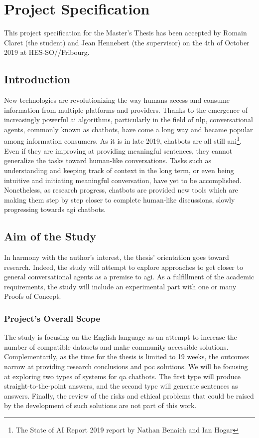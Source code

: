 \chapter*{Project Specification}
This project specification for the Master's Thesis has been accepted by Romain Claret (the student) and Jean Hennebert (the supervisor) on the 4th of October 2019 at HES-SO//Fribourg.

\section*{Introduction}
New technologies are revolutionizing the way humans access and consume information from multiple platforms and providers. Thanks to the emergence of increasingly powerful \gls{ai} algorithms, particularly in the field of \gls{nlp}, conversational agents, commonly known as chatbots, have come a long way and became popular among information consumers. As it is in late 2019, chatbots are all still \gls{ani}\footnote{The State of AI Report 2019 report by Nathan Benaich and Ian Hogar\cite{studies:state_of_ai_2019}}. Even if they are improving at providing meaningful sentences, they cannot generalize the tasks toward human-like conversations. Tasks such as understanding and keeping track of context in the long term, or even being intuitive and initiating meaningful conversation, have yet to be accomplished. Nonetheless, as research progress, chatbots are provided new tools which are making them step by step closer to complete human-like discussions, slowly progressing towards \gls{agi} chatbots.


\section*{Aim of the Study}
In harmony with the author's interest, the thesis' orientation goes toward research. Indeed, the study will attempt to explore approaches to get closer to general conversational agents as a premise to \gls{agi}. As a fulfillment of the academic requirements, the study will include an experimental part with one or many Proofs of Concept.

\subsection*{Project's Overall Scope}
The study is focusing on the English language as an attempt to increase the number of compatible datasets and make community accessible solutions. Complementarily, as the time for the thesis is limited to 19 weeks, the outcomes narrow at providing research conclusions and \gls{poc} solutions. We will be focusing at exploring two types of systems for \gls{qa} chatbots. The first type will produce straight-to-the-point answers, and the second type will generate sentences as answers. Finally, the review of the risks and ethical problems that could be raised by the development of such solutions are not part of this work.


